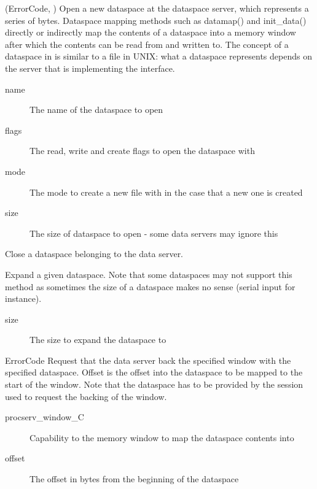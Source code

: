 \begin{description}
      
    \item {}
        {(ErrorCode, )}
    Open a new dataspace at the dataspace server, which represents a series of bytes. Dataspace mapping methods such as datamap() and init\_data() directly or indirectly map the contents of a dataspace into a memory window after which the contents can be read from and written to. The concept of a dataspace in  is similar to a file in UNIX: what a dataspace represents depends on the server that is implementing the interface.
    \begin{description}
        \item [name] The name of the dataspace to open
        \item [flags] The read, write and create flags to open the dataspace with
        \item [mode] The mode to create a new file with in the case that a new one is created
        \item [size] The size of dataspace to open - some data servers may ignore this
    \end{description}

    \item {}
    Close a dataspace belonging to the data server.

    \item {}
    Expand a given dataspace. Note that some dataspaces may not support this method as sometimes the size of a dataspace makes no sense (serial input for instance).
    \begin{description}
        \item [size] The size to expand the dataspace to
    \end{description}

    \item {}
        {ErrorCode}
    Request that the data server back the specified window with the specified dataspace. Offset is the offset into the dataspace to be mapped to the start of the window. Note that the dataspace has to be provided by the session used to request the backing of the window.
    \begin{description}
        \item [procserv\_window\_C] Capability to the memory window to map the dataspace contents into
        \item [offset] The offset in bytes from the beginning of the dataspace
    \end{description}


\end{description}
